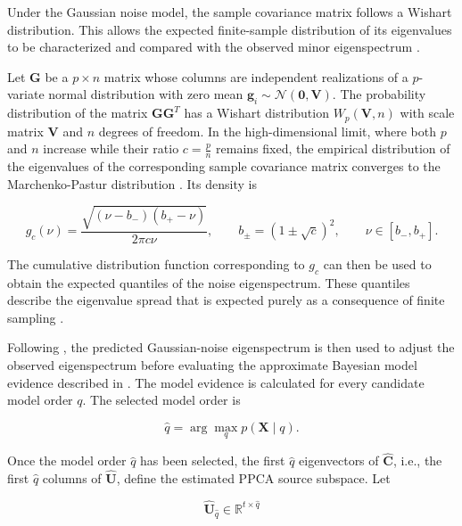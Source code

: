 \documentclass[english]{pwr_wmat_praca_dyplomowa}
\theoremstyle{definition}
\theoremstyle{remark}
\begin{document}
Under the Gaussian noise model, the sample covariance matrix follows a Wishart distribution. This allows the expected finite-sample distribution of its eigenvalues to be characterized and compared with the observed minor eigenspectrum \cite{pica}.

Let $\mathbf{G}$ be a $p \times n$ matrix whose columns are independent realizations of a $p$-variate normal distribution with zero mean $\mathbf{g}_i \sim \mathcal{N}(\mathbf{0}, \mathbf{V})$. The probability distribution of the matrix $\mathbf{G}\mathbf{G}^T$ has a Wishart distribution $W_p(\mathbf{V}, n)$ with scale matrix $\mathbf{V}$ and $n$ degrees of freedom. In the high-dimensional limit, where both $p$ and $n$ increase while their ratio $c = \frac{p}{n}$ remains fixed, the empirical distribution of the eigenvalues of the corresponding sample covariance matrix converges to the Marchenko-Pastur distribution \cite{pica}. Its density is

\begin{equation}
    g_c(\nu) = \frac{\sqrt{(\nu - b_-)(b_+ - \nu)}}{2\pi c\nu},
    \qquad
    b_\pm = (1 \pm \sqrt{c})^2,
    \qquad \nu \in [b_-, b_+].
\end{equation}

The cumulative distribution function corresponding to $g_c$ can then be used to obtain the expected quantiles of the noise eigenspectrum. These quantiles describe the eigenvalue spread that is expected purely as a consequence of finite sampling \cite{pica}.

Following \cite{pica}, the predicted Gaussian-noise eigenspectrum is then used to adjust the observed eigenspectrum before evaluating the approximate Bayesian model evidence described in \cite[Equation 10]{pica}. The model evidence is calculated for every candidate model order $q$. The selected model order is

\begin{equation}
    \widehat{q} = \arg\max_q p(\mathbf{X}\mid q).
\end{equation}

Once the model order $\widehat{q}$ has been selected, the first $\widehat{q}$ eigenvectors of $\widehat{\mathbf{C}}$, i.e., the first $\widehat{q}$ columns of $\widehat{\mathbf{U}}$, define the estimated PPCA source subspace. Let

\begin{equation}
    \widehat{\mathbf{U}}_{\widehat{q}} \in \mathbb{R}^{t\times\widehat{q}}
\end{equation}
\end{document}
